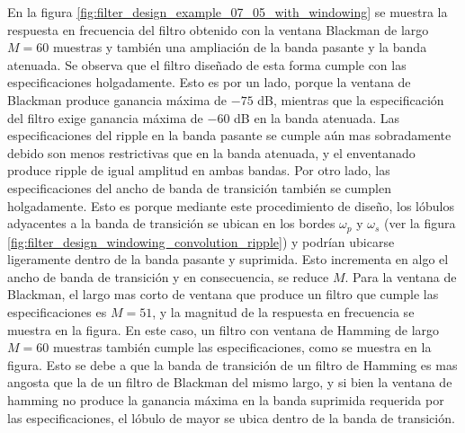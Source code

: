 \documentclass[a4paper]{report}
\begin{document}
En la figura \ref{fig:filter_design_example_07_05_with_windowing} se muestra la respuesta en frecuencia del filtro obtenido con la ventana Blackman de largo \(M=60\) muestras y también una ampliación de la banda pasante y la banda atenuada. Se observa que el filtro diseñado de esta forma cumple con las especificaciones holgadamente. Esto es por un lado, porque la ventana de Blackman produce ganancia máxima de \(-75\) dB, mientras que la especificación del filtro exige ganancia máxima de \(-60\) dB en la banda atenuada. Las especificaciones del ripple en la banda pasante se cumple aún mas sobradamente debido son menos restrictivas que en la banda atenuada, y el enventanado produce ripple de igual amplitud en ambas bandas. Por otro lado, las especificaciones del ancho de banda de transición también se cumplen holgadamente. Esto es porque mediante este procedimiento de diseño, los lóbulos adyacentes a la banda de transición se ubican en los bordes \(\omega_p\) y \(\omega_s\) (ver la figura \ref{fig:filter_design_windowing_convolution_ripple}) y podrían ubicarse ligeramente dentro de la banda pasante y suprimida. Esto incrementa en algo el ancho de banda de transición y en consecuencia, se reduce \(M\). Para la ventana de Blackman, el largo mas corto de ventana que produce un filtro que cumple las especificaciones es \(M=51\), y la magnitud de la respuesta en frecuencia se muestra en la figura.  
En este caso, un filtro con ventana de Hamming de largo \(M=60\) muestras también cumple las especificaciones, como se muestra en la figura. Esto se debe a que la banda de transición de un filtro de Hamming es mas angosta que la de un filtro de Blackman del mismo largo, y si bien la ventana de hamming no produce la ganancia máxima en la banda suprimida requerida por las especificaciones, el lóbulo de mayor se ubica dentro de la banda de transición.
\end{document}
